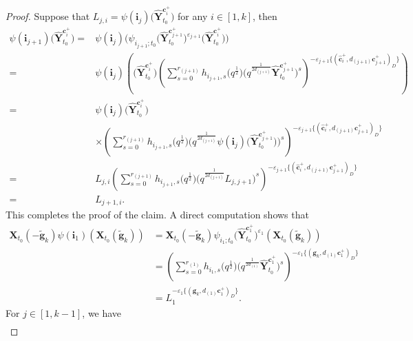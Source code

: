 \documentclass[11pt]{article}
\numberwithin{equation}{section}
\numberwithin{equation}{section}
\begin{document}
\begin{proof}
 Suppose that $L_{j,i}=\psi(\mathbf{i}_{j})\bigl(\mathbf{\hat{Y}}_{t_{0}}^{\mathbf{c}_{i}^{+}}\bigr)$ for any $i\in[1,k]$, then
 \begin{align*}
 \psi(\mathbf{i}_{j+1})\bigl(\mathbf{\hat{Y}}_{t_{0}}^{\mathbf{c}_{i}^{+}}\bigr)
 ={}&\psi(\mathbf{i}_{j})\bigl(\psi_{i_{j+1};t_{0}}\bigl(\mathbf{\hat{Y}}_{t_{0}}^{\mathbf{c}_{j+1}^{+}}\bigr)^{\varepsilon_{j+1}}\bigl(\mathbf{\hat{Y}}_{t_{0}}^{\mathbf{c}_{i}^{+}}\bigr)\bigr)\\
 ={}&\psi(\mathbf{i}_{j})\left(\bigl(\mathbf{\hat{Y}}_{t_{0}}^{\mathbf{c}_{i}^{+}}\bigr)\left(\sum\limits^{r_{(j+1)}}_{s=0}h_{i_{j+1},s}
 \bigl(q^{\frac{1}{2}}\bigr)\bigl(q^{\frac{1}{2d_{(j+1)}}}\mathbf{\hat{Y}}_{t_{0}}^{\mathbf{c}_{j+1}^{+}}\bigr)^{s}\right)^{-\varepsilon_{j+1}
 \{(\mathbf{\hat{c}}_{i}^{+},d_{(j+1)}\mathbf{c}_{j+1}^{+})_{D}\}}\right)\\
 ={}&\psi(\mathbf{i}_{j})\bigl(\mathbf{\hat{Y}}_{t_{0}}^{\mathbf{c}_{i}^{+}}\bigr)\\
 &\times\left(\sum\limits^{r_{(j+1)}}_{s=0}h_{i_{j+1},s}\bigl(q^{\frac{1}{2}}\bigr)
 \bigl(q^{\frac{1}{2d_{(j+1)}}}\psi(\mathbf{i}_{j})\bigl(\mathbf{\hat{Y}}_{t_{0}}^{\mathbf{c}_{j+1}^{+}}\bigr)\bigr)^{s}\right)^{-\varepsilon_{j+1}\{(\mathbf{\hat{c}}_{i}^{+},d_{(j+1)}\mathbf{c}_{j+1}^{+})_{D}\}}\\
 ={}&L_{j,i}\left(\sum\limits^{r_{(j+1)}}_{s=0}h_{i_{j+1},s}\bigl(q^{\frac{1}{2}}\bigr)\bigl(q^{\frac{1}{2d_{(j+1)}}}L_{j,j+1}\bigr)^{s}\right)^{-\varepsilon_{j+1}
 \{(\mathbf{\hat{c}}_{i}^{+},d_{(j+1)}\mathbf{c}_{j+1}^{+})_{D}\}}\\
 ={}&L_{j+1,i}.
 \end{align*}
 This completes the proof of the claim.
 A direct computation shows that
 \begin{align*}
 \mathbf{X}_{t_0}(-\mathbf{\tilde{g}}_{k})\psi(\mathbf{i}_{1})(\mathbf{X}_{t_0}(\mathbf{\tilde{g}}_{k}))
 &=\mathbf{X}_{t_0}(-\mathbf{\tilde{g}}_{k})\psi_{i_{1};t_{0}}\bigl(\mathbf{\hat{Y}}_{t_{0}}^{\mathbf{c}_{1}^{+}}\bigr)^{\varepsilon_{1}}(\mathbf{X}_{t_0}(\mathbf{\tilde{g}}_{k}))\\
 &=\left(\sum\limits^{r_{(1)}}_{s=0}h_{i_{1},s}\bigl(q^{\frac{1}{2}}\bigr)\bigl(q^{\frac{1}{2d_{(1)}}}\mathbf{\hat{Y}}_{t_{0}}^{\mathbf{c}_{1}^{+}}\bigr)^{s}\right)^{-\varepsilon_{1}\{(\mathbf{g}_{k},d_{(1)}\mathbf{c}_{1}^{+})_{D}\}}\\
 &=L_{1}^{-\varepsilon_{1}\{(\mathbf{g}_{k},d_{(1)}\mathbf{c}_{1}^{+})_{D}\}}.
 \end{align*}
 For $j\in[1,k-1]$, we have
 \begin{gather*}

\end{gather*}
\end{proof}
\end{document}
